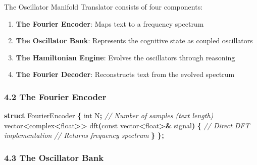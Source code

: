 \documentclass[
  11pt,
  a4paper,
]{article}
\newenvironment{Shaded}{\begin{snugshade}}{\end{snugshade}}
\newcommand{\AttributeTok}[1]{\textcolor[rgb]{0.13,0.29,0.53}{#1}}
\newcommand{\CommentTok}[1]{\textcolor[rgb]{0.56,0.35,0.01}{\textit{#1}}}
\newcommand{\DataTypeTok}[1]{\textcolor[rgb]{0.13,0.29,0.53}{#1}}
\newcommand{\KeywordTok}[1]{\textcolor[rgb]{0.13,0.29,0.53}{\textbf{#1}}}
\newcommand{\NormalTok}[1]{#1}
\newcommand{\OperatorTok}[1]{\textcolor[rgb]{0.81,0.36,0.00}{\textbf{#1}}}
\providecommand{\tightlist}{%
  \setlength{\itemsep}{0pt}\setlength{\parskip}{0pt}}
\begin{document}
The Oscillator Manifold Translator consists of four components:

\begin{enumerate}
\def\labelenumi{\arabic{enumi}.}
\tightlist
\item
  \textbf{The Fourier Encoder}: Maps text to a frequency spectrum
\item
  \textbf{The Oscillator Bank}: Represents the cognitive state as
  coupled oscillators
\item
  \textbf{The Hamiltonian Engine}: Evolves the oscillators through
  reasoning
\item
  \textbf{The Fourier Decoder}: Reconstructs text from the evolved
  spectrum
\end{enumerate}

\subsubsection{4.2 The Fourier Encoder}\label{the-fourier-encoder}

\begin{Shaded}
\begin{Highlighting}[]
\KeywordTok{struct}\NormalTok{ FourierEncoder }\OperatorTok{\{}
    \DataTypeTok{int}\NormalTok{ N}\OperatorTok{;}  \CommentTok{// Number of samples (text length)}
\NormalTok{    vector}\OperatorTok{\textless{}}\NormalTok{complex}\OperatorTok{\textless{}}\DataTypeTok{float}\OperatorTok{\textgreater{}\textgreater{}}\NormalTok{ dft}\OperatorTok{(}\AttributeTok{const}\NormalTok{ vector}\OperatorTok{\textless{}}\DataTypeTok{float}\OperatorTok{\textgreater{}\&}\NormalTok{ signal}\OperatorTok{)} \OperatorTok{\{}
        \CommentTok{// Direct DFT implementation}
        \CommentTok{// Returns frequency spectrum}
    \OperatorTok{\}}
\OperatorTok{\};}
\end{Highlighting}
\end{Shaded}

\subsubsection{4.3 The Oscillator Bank}\label{the-oscillator-bank}
\end{document}
